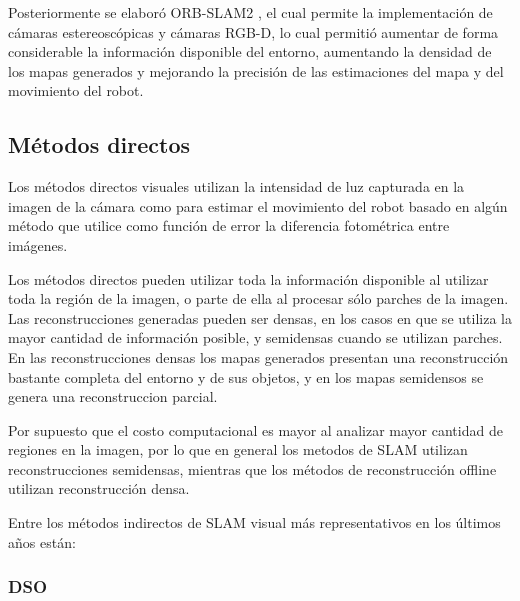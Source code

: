 Posteriormente se elaboró ORB-SLAM2 \cite{orbSlam2}, el cual permite la implementación de cámaras estereoscópicas y cámaras RGB-D,
lo cual permitió aumentar de forma considerable la información disponible del entorno, aumentando la densidad de los mapas generados y mejorando la precisión de las estimaciones del mapa y del movimiento del robot.


\subsection{Métodos directos}

Los métodos directos visuales utilizan la intensidad de luz capturada en la imagen de la cámara como para estimar el movimiento del robot basado en algún método que utilice como función de error la diferencia fotométrica entre imágenes. 

Los métodos directos pueden utilizar toda la información disponible al utilizar toda la región de la imagen, o parte de ella al procesar sólo parches de la imagen. Las reconstrucciones generadas pueden ser densas, en los casos en que se utiliza la mayor cantidad de información posible, y semidensas cuando se utilizan parches. En las reconstrucciones densas los mapas generados presentan una reconstrucción bastante completa del entorno y de sus objetos, y en los mapas semidensos se genera una reconstruccion parcial.

Por supuesto que el costo computacional es mayor al analizar mayor cantidad de regiones en la imagen, por lo que en general los metodos de SLAM utilizan reconstrucciones semidensas, mientras que los métodos de reconstrucción offline utilizan reconstrucción densa.

Entre los métodos indirectos de SLAM visual más representativos en los últimos
años están: 

\subsubsection{DSO}

